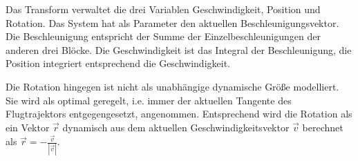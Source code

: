 \label{transform}
Das Transform verwaltet die drei Variablen Geschwindigkeit, Position und Rotation. Das System hat als Parameter den aktuellen Beschleunigungsvektor. Die Beschleunigung entspricht der Summe der Einzelbeschleunigungen der anderen drei Blöcke. Die Geschwindigkeit ist das Integral der Beschleunigung, die Position integriert entsprechend die Geschwindigkeit.

Die Rotation hingegen ist nicht als unabhängige dynamische Größe modelliert. Sie wird als optimal geregelt, i.e. immer der aktuellen Tangente des Flugtrajektors entgegengesetzt, angenommen. Entsprechend wird die Rotation als ein Vektor $\vec r$ dynamisch aus dem aktuellen Geschwindigkeitsvektor $\vec v$ berechnet als $\vec r = -\frac{\vec v}{|\vec v|}$.\\ \\